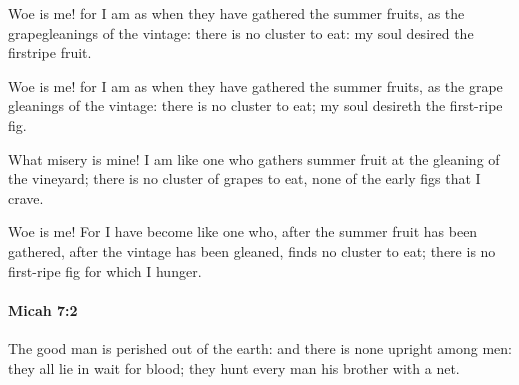 			Woe is me! for I am as when they have gathered the summer fruits, as the grapegleanings of the vintage: there is no cluster to eat: my soul desired the firstripe fruit.

			\begin{versebox}
					\item[BHS] 
					\item[LXX] 
					\item[ASV] Woe is me! for I am as when they have gathered the summer fruits, as the grape gleanings of the vintage: there is no cluster to eat; my soul desireth the first-ripe fig.
					\item[NIV] What misery is mine! I am like one who gathers summer fruit at the gleaning of the vineyard; there is no cluster of grapes to eat, none of the early figs that I crave.
					\item[NRSV] Woe is me! For I have become like one who, after the summer fruit has been gathered, after the vintage has been gleaned, finds no cluster to eat; there is no first-ripe fig for which I hunger.
			\end{versebox}

		\paragraph{Micah 7:2} %
			\label{MICAH-7-2}

			The good man is perished out of the earth: and there is none upright among men: they all lie in wait for blood; they hunt every man his brother with a net.

